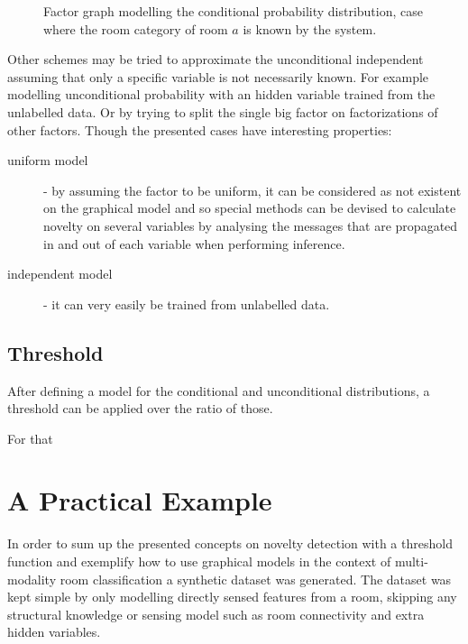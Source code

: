 \begin{figure}[h]
{
}

\caption{Factor graph modelling the conditional probability distribution, case where the
         room category of room $a$ is known by the system.}
\end{figure}
 

Other schemes may be tried to approximate the unconditional independent assuming that only
a specific variable is not necessarily known. For example modelling unconditional probability
with an hidden variable trained from the unlabelled data. Or by trying to split the single big
factor on factorizations of other factors.
Though the presented cases have interesting properties:

\begin{description}
\item[uniform model] - by assuming the factor to be uniform, it can be considered as not existent on
the graphical model and so special methods can be devised to calculate novelty on several variables
by analysing the messages that are propagated in and out of each variable when performing inference.

\item[independent model] - it can very easily be trained from unlabelled data. 
\end{description}

\subsection{Threshold}
After defining a model for the conditional and unconditional distributions, a threshold can be applied
over the ratio of those.

For that 

\section{A Practical Example}
\label{sec:unlabelled-data}
In order to sum up the presented concepts on novelty detection with a threshold
function and exemplify how to use graphical models in the context of
multi-modality room classification a synthetic dataset was generated.
The dataset was kept simple by only modelling directly sensed features from a
room, skipping any structural knowledge or sensing model such as room
connectivity and extra hidden variables.

